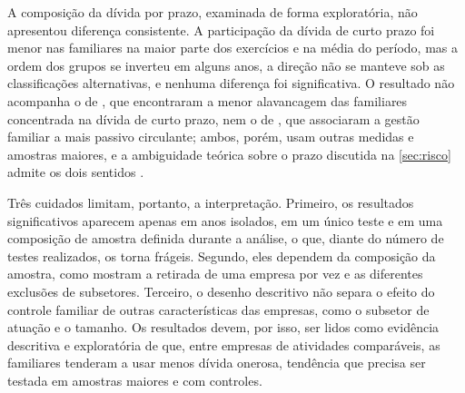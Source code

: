 A composição da dívida por prazo, examinada de forma exploratória, não apresentou
diferença consistente. A participação da dívida de curto prazo foi menor nas
familiares na maior parte dos exercícios e na média do período, mas a ordem dos
grupos se inverteu em alguns anos, a direção não se manteve sob as classificações
alternativas, e nenhuma diferença foi significativa. O resultado não acompanha o de
, que encontraram a menor alavancagem das familiares
concentrada na dívida de curto prazo, nem o de , que
associaram a gestão familiar a mais passivo circulante; ambos, porém, usam outras
medidas e amostras maiores, e a ambiguidade teórica sobre o prazo discutida na
\autoref{sec:risco} admite os dois sentidos \cite{diamond1991}.

Três cuidados limitam, portanto, a interpretação. Primeiro, os resultados
significativos aparecem apenas em anos isolados, em um único teste e em uma
composição de amostra definida durante a análise, o que, diante do número de testes
realizados, os torna frágeis. Segundo, eles dependem da composição da amostra, como
mostram a retirada de uma empresa por vez e as diferentes exclusões de subsetores.
Terceiro, o desenho descritivo não separa o efeito do controle familiar de outras
características das empresas, como o subsetor de atuação \cite{oliveira2020} e o
tamanho. Os resultados devem, por isso, ser lidos como evidência descritiva e
exploratória de que, entre empresas de atividades comparáveis, as familiares
tenderam a usar menos dívida onerosa, tendência que precisa ser testada em amostras
maiores e com controles.
